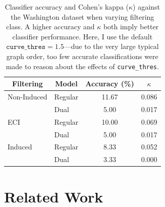 \documentclass{mpaper}
\begin{document}
\begin{table}
	\centering

	\begin{tabular}{llcc}
		\toprule
		\multicolumn{1}{c}{Filtering} & \multicolumn{1}{c}{Model} & Accuracy (\si{\percent}) & $\kappa$ \\
		\midrule
		
		Non-Induced & Regular & 11.67 & 0.086 \\
		& Dual & 5.00 & 0.017 \\
		
		ECI & Regular & 10.00 & 0.069 \\
		& Dual & 5.00 & 0.017 \\
		
		Induced & Regular & 8.33 & 0.052 \\
		& Dual & 3.33 & 0.000 \\
		
		\bottomrule
	\end{tabular}
	
	\vspace{0.5em}
	\caption{
		Classifier accuracy and Cohen's kappa ($\kappa$) against the Washington dataset when varying filtering class.
		A higher accuracy and $\kappa$ both imply better classifier performance.
		Here, I use the default $\mathtt{curve\_thres}=1.5$---due to the very large typical graph order, too few accurate classifications were made to reason about the effects of \texttt{curve\_thres}.
		\label{tab:exp3}
	}
\end{table}

%
%
%

\section{Related Work}
\label{sec:related}
\end{document}
